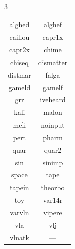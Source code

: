 \documentclass[a4paper, landscape]{book}
\begin{document}
\begin{multicols}{3}
\begin{center}
\begin{tabular}{ c|c } 
alghed & alghef \\
caillou & capr1x \\
capr2x & chime \\
chiseq & dismatter \\
distmar & falga \\
gameld & gamelf \\
grr & iveheard \\
kali & malon \\
meli & noinput \\
pert & pharm \\
quar & quar2 \\
sin & sinimp \\
space & tape \\
tapein & theorbo \\
toy & var14r \\
varvln & vipere \\
vla & vlj \\
vlnatk & --- \\

\end{tabular}
\end{center}
\columnbreak

\end{multicols}
\end{document}
